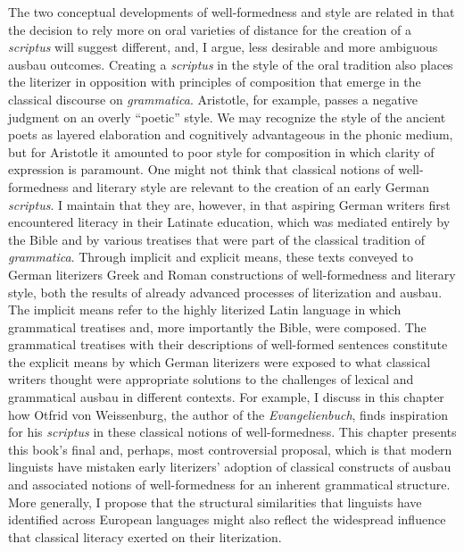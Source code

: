The two conceptual developments of well-formedness and style are related in that the decision to rely more on oral varieties of distance for the creation of a \textit{scriptus} will suggest different, and, I argue, less desirable and more ambiguous ausbau outcomes. Creating a \textit{scriptus} in the style of the oral tradition also places the literizer in opposition with principles of composition that emerge in the classical discourse on \textit{grammatica}. Aristotle, for example, passes a negative judgment on an overly “poetic” style. We may recognize the style of the ancient poets as layered elaboration and cognitively advantageous in the phonic medium, but for Aristotle it amounted to poor style for composition in which clarity of expression is paramount. One might not think that classical notions of well-formedness and literary style are relevant to the creation of an early German \textit{scriptus}. I maintain that they are, however, in that aspiring German writers first encountered literacy in their Latinate education, which was mediated entirely by the Bible and by various treatises that were part of the classical tradition of \textit{grammatica}. Through implicit and explicit means, these texts conveyed to German literizers Greek and Roman constructions of well-formedness and literary style, both the results of already advanced processes of literization and ausbau. The implicit means refer to the highly literized Latin language in which grammatical treatises and, more importantly the Bible, were composed. The grammatical treatises with their descriptions of well-formed sentences constitute the explicit means by which German literizers were exposed to what classical writers thought were appropriate solutions to the challenges of lexical and grammatical ausbau in different contexts. For example, I discuss in this chapter how Otfrid von Weissenburg, the author of the \textit{Evangelienbuch}, finds inspiration for his \textit{scriptus} in these classical notions of well-formedness. This chapter presents this book’s final and, perhaps, most controversial proposal, which is that modern linguists have mistaken early literizers’ adoption of classical constructs of ausbau and associated notions of well-formedness for an inherent grammatical structure. More generally, I propose that the structural similarities that linguists have identified across European languages might also reflect the widespread influence that classical literacy exerted on their literization. 

